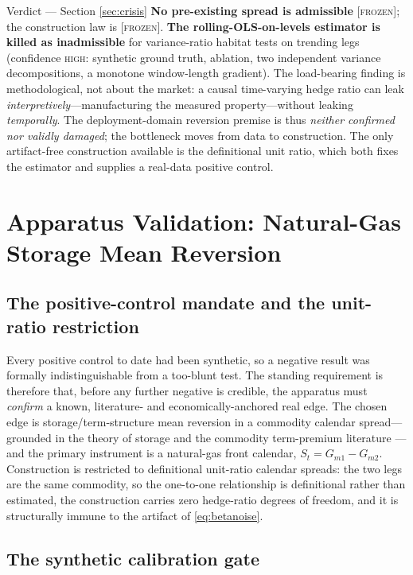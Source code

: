 \documentclass[11pt,a4paper]{article}
\newcommand{\status}[1]{{\small\textsc{[#1]}}}
\begin{document}
\begin{verdict}{Verdict --- Section \ref{sec:crisis}}
\small
\textbf{No pre-existing spread is admissible} \status{frozen}; the construction law is \status{frozen}.
\textbf{The rolling-OLS-on-levels estimator is killed as inadmissible} for variance-ratio habitat tests
on trending legs (confidence \textsc{high}: synthetic ground truth, ablation, two independent variance
decompositions, a monotone window-length gradient). The load-bearing finding is methodological, not
about the market: a causal time-varying hedge ratio can leak \emph{interpretively}---manufacturing the
measured property---without leaking \emph{temporally}. The deployment-domain reversion premise is thus
\emph{neither confirmed nor validly damaged}; the bottleneck moves from data to construction. The only
artifact-free construction available is the definitional unit ratio, which both fixes the estimator and
supplies a real-data positive control.
\end{verdict}

\section{Apparatus Validation: Natural-Gas Storage Mean Reversion}
\label{sec:apparatus}

\subsection{The positive-control mandate and the unit-ratio restriction}

Every positive control to date had been synthetic, so a negative result was formally indistinguishable
from a too-blunt test. The standing requirement is therefore that, before any further negative is
credible, the apparatus must \emph{confirm} a known, literature- and economically-anchored real edge.
The chosen edge is storage/term-structure mean reversion in a commodity calendar spread---grounded in
the theory of storage \cite{Working1949} and the commodity term-premium literature
\cite{Szymanowska2014}---and the primary instrument is a natural-gas front calendar, $S_t = G_{m1}-G_{m2}$.
Construction is restricted to definitional unit-ratio calendar spreads: the two legs are the same
commodity, so the one-to-one relationship is definitional rather than estimated, the construction
carries zero hedge-ratio degrees of freedom, and it is structurally immune to the artifact of
\eqref{eq:betanoise}.

\subsection{The synthetic calibration gate}
\end{document}
